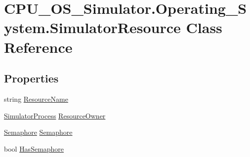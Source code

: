 \hypertarget{class_c_p_u___o_s___simulator_1_1_operating___system_1_1_simulator_resource}{}\section{C\+P\+U\+\_\+\+O\+S\+\_\+\+Simulator.\+Operating\+\_\+\+System.\+Simulator\+Resource Class Reference}
\label{class_c_p_u___o_s___simulator_1_1_operating___system_1_1_simulator_resource}
\subsection*{Properties}
\begin{DoxyCompactItemize}
\item 
string \hyperlink{class_c_p_u___o_s___simulator_1_1_operating___system_1_1_simulator_resource_a2ddefd27fa58cbc321755490982a99b9}{Resource\+Name}
\item 
\hyperlink{class_c_p_u___o_s___simulator_1_1_operating___system_1_1_simulator_process}{Simulator\+Process} \hyperlink{class_c_p_u___o_s___simulator_1_1_operating___system_1_1_simulator_resource_a73274ed0508be283fedfd4972133a41b}{Resource\+Owner}
\item 
\hyperlink{class_c_p_u___o_s___simulator_1_1_operating___system_1_1_threading_1_1_semaphore}{Semaphore} \hyperlink{class_c_p_u___o_s___simulator_1_1_operating___system_1_1_simulator_resource_a4d036101fc7fe264c6b7a4533def8cfe}{Semaphore}
\item 
bool \hyperlink{class_c_p_u___o_s___simulator_1_1_operating___system_1_1_simulator_resource_a97b25af96cd3169b7ca4d8089d38e9ab}{Has\+Semaphore}
\end{DoxyCompactItemize}
